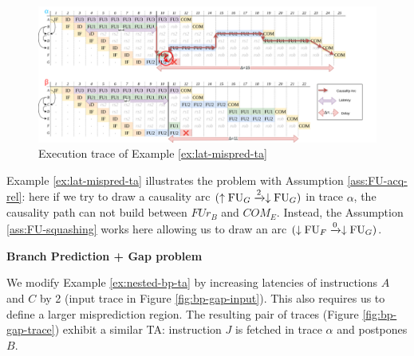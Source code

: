 \begin{figure}[H]
    \centering
    \includegraphics[width=\textwidth]{figures/lat-mispred.png}
    \caption{Execution trace of Example \ref{ex:lat-mispred-ta}}
    \label{fig:lat-mispred-ta-trace}
\end{figure}

Example \ref{ex:lat-mispred-ta} illustrates the problem with Assumption \ref{ass:FU-acq-rel}:  here if we try to draw a causality arc $(\uparrow\mathrm{FU}_G \xrightarrow{2} \downarrow\mathrm{FU}_G)$ in trace $\alpha$, the causality path can not build between $FUr_B$ and $COM_E$. Instead, the Assumption \ref{ass:FU-squashing} works here allowing us to draw an arc $(\downarrow\mathrm{FU}_F \xrightarrow{0} \downarrow\mathrm{FU}_G)$.



\begin{example}
\textbf{Branch Prediction + Gap problem}

We modify Example \ref{ex:nested-bp-ta} by increasing latencies of instructions $A$ and $C$ by 2 (input trace in Figure \ref{fig:bp-gap-input}). This also requires us to define a larger misprediction region. The resulting pair of traces (Figure \ref{fig:bp-gap-trace}) exhibit a similar TA: instruction $J$ is fetched in trace $\alpha$ and postpones $B$.

\label{ex:bp-gap}
\end{example}

